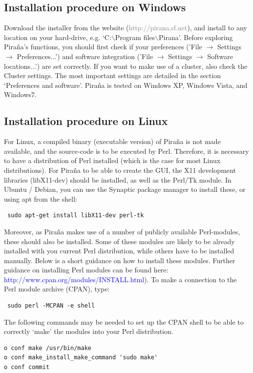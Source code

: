 \documentclass[a4,11pt]{report} \usepackage[pdftex]{graphicx}
\begin{document}
\subsection{Installation procedure on Windows} Download the installer
from the website (\textcolor{Grey}{http://pirana.sf.net}), and install
to any location on your hard-drive, e.g. `C:$\backslash$Program
files$\backslash$Pirana'. Before exploring Pira\~na's functions, you
should first check if your preferences ('File $\rightarrow$
Settings $\rightarrow$ Preferences...') and software integration
('File $\rightarrow$ Settings $\rightarrow$ Software locations...')
are set correctly. If you want to make use of a cluster, also check the
Cluster settings. The most important settings are
detailed in the section `Preferences and software'. Pira\~na is tested
on Windows XP, Windows Vista, and Windows7.

\subsection{Installation procedure on Linux} For Linux, a compiled
binary (executable version) of Pira\~na is not made available, and the
source-code is to be executed by Perl. Therefore, it is necessary to
have a distribution of Perl installed (which is the case for most
Linux distributions). For Pira\~na to be able to create the GUI, the
X11 development libraries (libX11-dev) should be installed, as well as
the Perl/Tk module. In Ubuntu / Debian, you can use the Synaptic package
manager to install these, or using apt from the shell:

\begin{verbatim} sudo apt-get install libX11-dev perl-tk
\end{verbatim}

\noindent Moreover, as Pira\~na makes use of a number of publicly
available Perl-modules, these should also be installed. Some of these
modules are likely to be already installed with you current Perl
distribution, while others have to be installed manually. Below is a
short guidance on how to install these modules. Further guidance on
installing Perl modules can be found here: \textcolor{Blue}{
http://www.cpan.org/modules/INSTALL.html}). To make a connection to
the Perl module archive (CPAN), type:
\begin{verbatim} sudo perl -MCPAN -e shell
\end{verbatim}

\noindent The following commands may be needed to set up the CPAN
shell to be able to correctly `make' the modules into your Perl distribution.
\begin{verbatim}
o conf make /usr/bin/make
o conf make_install_make_command 'sudo make'
o conf commit
\end{verbatim}
\end{document}
